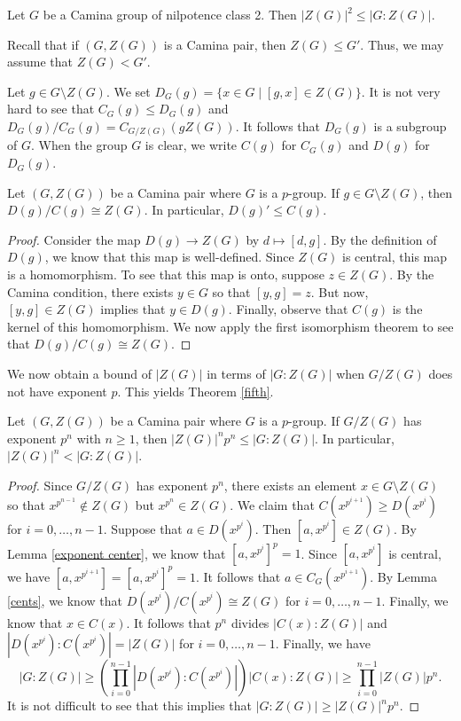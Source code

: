 \begin{lemma} \label{Camina gp}
Let $G$ be a Camina group of nilpotence class 2.  Then $|Z(G)|^2 \le |G:Z (G)|$.
\end{lemma}

Recall that if $(G,Z(G))$ is a Camina pair, then $Z(G) \le G'$. Thus, we may assume that $Z(G) < G'$.

Let $g \in G \setminus Z(G)$.  We set $D_G (g) = \{ x \in G \mid [g,x] \in Z(G) \}$.  It is not very hard to see that $C_G (g) \le D_G (g)$ and $D_G (g)/C_G (g) = C_{G/Z(G)} (gZ(G))$.  It follows that $D_G (g)$ is a subgroup of $G$.  When the group $G$ is clear, we write $C (g)$ for $C_G (g)$ and $D (g)$ for $D_G (g)$.

\begin{lemma}\label{cents}
Let $(G,Z(G))$ be a Camina pair where $G$ is a $p$-group.  If $g \in G \setminus Z(G)$, then $D (g)/C (g) \cong Z(G)$.  In particular, $D (g)' \le C (g)$.
\end{lemma}

\begin{proof}
Consider the map $D (g) \rightarrow Z(G)$ by $d \mapsto [d,g]$.  By the definition of $D (g)$, we know that this map is well-defined.  Since $Z (G)$ is central, this map is a homomorphism.  To see that this map is onto, suppose $z \in Z (G)$.  By the Camina condition, there exists $y \in G$ so that $[y,g] = z$.  But now, $[y,g] \in Z(G)$ implies that $y \in D (g)$.  Finally, observe that $C (g)$ is the kernel of this homomorphism.  We now apply the first isomorphism theorem to see that $D (g)/C (g) \cong Z(G)$.
\end{proof}

We now obtain a bound of $|Z (G)|$ in terms of $|G:Z (G)|$ when $G/Z(G)$ does not have exponent $p$.  This yields Theorem \ref{fifth}.

\begin{theorem}\label{exponent quotient}
Let $(G,Z(G))$ be a Camina pair where $G$ is a $p$-group.  If $G/Z(G)$ has exponent $p^n$ with $n \ge 1$, then $|Z (G)|^n p^n \le |G:Z (G)|$.  In particular, $|Z (G)|^n < |G:Z (G)|$.
\end{theorem}

\begin{proof}
Since $G/Z(G)$ has exponent $p^n$, there exists an element $x \in G \setminus Z(G)$ so that $x^{p^{n-1}} \not\in Z(G)$ but $x^{p^n} \in Z(G)$.  We claim that $C (x^{p^{i+1}}) \ge D (x^{p^i})$ for $i = 0, \dots, n-1$.  Suppose that $a \in D (x^{p^i})$.  Then $[a,x^{p^i}] \in Z(G)$.  By Lemma \ref{exponent center}, we know that $[a,x^{p^i}]^p = 1$.  Since $[a,x^{p^i}]$ is central, we have $[a,x^{p^{i+1}}] = [a,x^{p^i}]^p = 1$.  It follows that $a \in C_G(x^{p^{i+1}})$.  By Lemma \ref{cents}, we know that $D (x^{p^i})/C (x^{p^i}) \cong Z (G)$ for $i = 0, \dots, n-1$.  Finally, we know that $x \in C (x)$.  It follows that $p^n$ divides $|C (x):Z (G)|$ and $|D (x^{p^i}):C (x^{p^i})| = |Z (G)|$ for $i = 0, \dots, n-1$.  Finally, we have
$$
|G:Z(G)| \ge \left(\prod_{i=0}^{n-1} |D (x^{p^i}):C (x^{p^i})| \right) |C (x):Z (G)| \ge \prod_{i=0}^{n-1} |Z (G)| p^n.
$$
It is not difficult to see that this implies that $|G: Z (G)| \ge |Z(G)|^n p^n.$
\end{proof}

